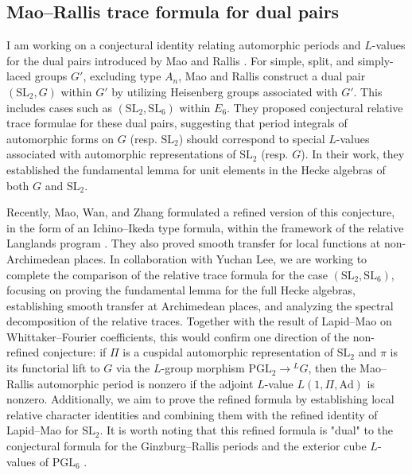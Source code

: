 \documentclass[12pt]{article}
\begin{document}
\subsection*{Mao--Rallis trace formula for dual pairs}

I am working on a conjectural identity relating automorphic periods and $L$-values for the dual pairs introduced by Mao and Rallis \cite{mao1997trace}.
For simple, split, and simply-laced groups $G'$, excluding type $A_n$, Mao and Rallis construct a dual pair $(\mathrm{SL}_{2}, G)$ within $G'$ by utilizing Heisenberg groups associated with $G'$.
This includes cases such as $(\mathrm{SL}_{2}, \mathrm{SL}_{6})$ within $E_6$.
They proposed conjectural relative trace formulae for these dual pairs, suggesting that period integrals of automorphic forms on $G$ (resp. $\mathrm{SL}_{2}$) should correspond to special $L$-values associated with automorphic representations of $\mathrm{SL}_{2}$ (resp. $G$).
In their work, they established the fundamental lemma for unit elements in the Hecke algebras of both $G$ and $\mathrm{SL}_{2}$.

Recently, Mao, Wan, and Zhang \cite{mao2023bzsv} formulated a refined version of this conjecture, in the form of an Ichino--Ikeda type formula, within the framework of the relative Langlands program \cite{ben2023relative}.
They also proved smooth transfer for local functions at non-Archimedean places.
In collaboration with Yuchan Lee, we are working to complete the comparison of the relative trace formula for the case $(\mathrm{SL}_{2}, \mathrm{SL}_{6})$, focusing on proving the fundamental lemma for the full Hecke algebras, establishing smooth transfer at Archimedean places, and analyzing the spectral decomposition of the relative traces.
Together with the result of Lapid--Mao \cite{lapid2015conjecture} on Whittaker--Fourier coefficients, this would confirm one direction of the non-refined conjecture: if $\Pi$ is a cuspidal automorphic representation of $\mathrm{SL}_{2}$ and $\pi$ is its functorial lift to $G$ via the $L$-group morphism $\mathrm{PGL}_{2} \to {}^L G$, then the Mao--Rallis automorphic period is nonzero if the adjoint $L$-value $L(1, \Pi, \mathrm{Ad})$ is nonzero.
Additionally, we aim to prove the refined formula by establishing local relative character identities and combining them with the refined identity of Lapid--Mao for $\mathrm{SL}_{2}$.
It is worth noting that this refined formula is "dual" to the conjectural formula for the Ginzburg--Rallis periods and the exterior cube $L$-values of $\mathrm{PGL}_{6}$ \cite{ginzburg2000exterior}.
\end{document}
